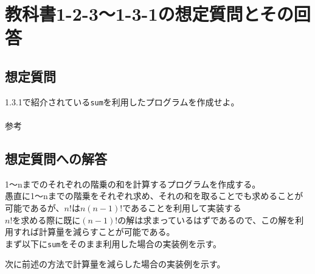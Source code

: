 \documentclass[a4paper,12pt]{article}
\begin{document}
\section{教科書1-2-3〜1-3-1の想定質問とその回答}
\subsection{想定質問}

1.3.1で紹介されている{\tt sum}を利用したプログラムを作成せよ。\\
\\
参考


\subsection{想定質問への解答}

1〜nまでのそれぞれの階乗の和を計算するプログラムを作成する。\\
愚直に1〜nまでの階乗をそれぞれ求め、それの和を取ることでも求めることが可能であるが、$n!$は${n(n-1)!}$であることを利用して実装する\\
$n!$を求める際に既に$(n-1)!$の解は求まっているはずであるので、この解を利用すれば計算量を減らすことが可能である。\\
まず以下に{\tt sum}をそのまま利用した場合の実装例を示す。



次に前述の方法で計算量を減らした場合の実装例を示す。


\end{document}
